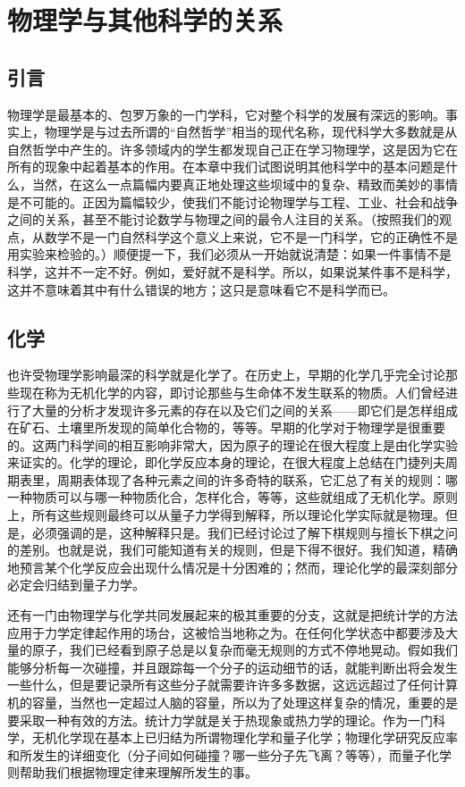 \chapter{物理学与其他科学的关系}

\section{引言}

物理学是最基本的、包罗万象的一门学科，它对整个科学的发展有深远的影响。事实上，物理学是与过去所谓的“自然哲学”相当的现代名称，现代科学大多数就是从自然哲学中产生的。许多领域内的学生都发现自己正在学习物理学，这是因为它在所有的现象中起着基本的作用。在本章中我们试图说明其他科学中的基本问题是什么，当然，在这么一点篇幅内要真正地处理这些坝域中的复杂、精致而美妙的事情是不可能的。正因为篇幅较少，使我们不能讨论物理学与工程、工业、社会和战争之间的关系，甚至不能讨论数学与物理之间的最令人注目的关系。（按照我们的观点，从数学不是一门自然科学这个意义上来说，它不是一门科学，它的正确性不是用实验来检验的。）顺便提一下，我们必须从一开始就说清楚：如果一件事情不是科学，这并不一定不好。例如，爱好就不是科学。所以，如果说某件事不是科学，这并不意味着其中有什么错误的地方；这只是意味看它不是科学而已。

\section{化学}

也许受物理学影响最深的科学就是化学了。在历史上，早期的化学几乎完全讨论那些现在称为无机化学的内容，即讨论那些与生命体不发生联系的物质。人们曾经进行了大量的分析才发现许多元素的存在以及它们之间的关系——即它们是怎样组成在矿石、土壤里所发现的简单化合物的，等等。早期的化学对于物理学是很重要的。这两门科学间的相互影响非常大，因为原子的理论在很大程度上是由化学实验来证实的。化学的理论，即化学反应本身的理论，在很大程度上总结在门捷列夫周期表里，周期表体现了各种元素之间的许多奇特的联系，它汇总了有关的规则：哪一种物质可以与哪一种物质化合，怎样化合，等等，这些就组成了无机化学。原则上，所有这些规则最终可以从量子力学得到解释，所以理论化学实际就是物理。但是，必须强调的是，这种解释只是。我们已经讨论过了解下棋规则与擅长下棋之问的差别。也就是说，我们可能知道有关的规则，但是下得不很好。我们知道，精确地预言某个化学反应会出现什么情况是十分困难的；然而，理论化学的最深刻部分必定会归结到量子力学。

还有一门由物理学与化学共同发展起来的极其重要的分支，这就是把统计学的方法应用于力学定律起作用的场台，这被恰当地称之为。在任何化学状态中都要涉及大量的原子，我们已经看到原子总是以复杂而毫无规则的方式不停地晃动。假如我们能够分析每一次碰撞，并且跟踪每一个分子的运动细节的话，就能判断出将会发生一些什么，但是要记录所有这些分子就需要许许多多数据，这远远超过了任何计算机的容量，当然也一定超过人脑的容量，所以为了处理这样复杂的情况，重要的是要采取一种有效的方法。统计力学就是关于热现象或热力学的理论。作为一门科学，无机化学现在基本上已归结为所谓物理化学和量子化学；物理化学研究反应率和所发生的详细变化（分子间如何碰撞？哪一些分子先飞离？等等），而量子化学则帮助我们根据物理定律来理解所发生的事。

